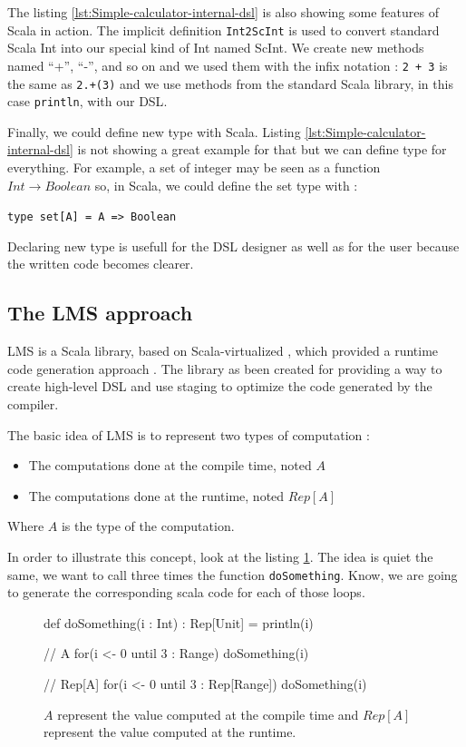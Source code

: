 The listing \ref{lst:Simple-calculator-internal-dsl} is also showing some
features of Scala in action. The implicit definition {\normalsize \verb|Int2ScInt|} is used to
convert standard Scala Int into our special kind of Int named ScInt. We create
new methods named ``+'', ``-'', and so on and we used them with the infix
notation : {\normalsize \verb|2 + 3|} is the same as {\normalsize \verb|2.+(3)|} and we use
methods from the standard Scala library, in this case {\normalsize
\verb|println|}, with our \gls{DSL}.

Finally, we could define new type with Scala. Listing
\ref{lst:Simple-calculator-internal-dsl} is not showing a great example for that
but we can define type for everything. For example, a set of integer may be seen
as a function $Int \rightarrow Boolean$ so, in Scala, we could define the set
type with :

\texttt{type set[A] = A => Boolean}

Declaring new type is usefull for the \gls{DSL} designer as well as for the user
because the written code becomes clearer.

\subsection{The LMS approach}
\label{subsec:lms_approach}

\gls{LMS} is a Scala library, based on Scala-virtualized \cite{Rompf2012}, which
provided a runtime code generation approach
\cite{Rompf:2010:LMS:1942788.1868314}. The library as been created for providing
a way to create high-level \gls{DSL} and use staging to optimize the code
generated by the compiler.

The basic idea of \gls{LMS} is to represent two types of computation :
\begin{itemize}
\item The computations done at the compile time, noted $A$
\item The computations done at the runtime, noted $Rep[A]$
\end{itemize}

Where $A$ is the type of the computation.

In order to illustrate this concept, look at the listing \ref{lst:lms-example}.
The idea is quiet the same, we want to call three times the function
{\normalsize \verb|doSomething|}. Know, we are going to generate the
corresponding scala code for each of those loops.

\begin{figure}[ht]
  \centering
\begin{scalacode}
def doSomething(i : Int) : Rep[Unit] = {
	println(i)
}

// A
for(i <- 0 until 3 : Range) {
	doSomething(i)
}

// Rep[A]
for(i <- 0 until 3 : Rep[Range]) {
	doSomething(i)
}
\end{scalacode}
  \caption[Difference between \(A\) and \(Rep\lbrack A\rbrack\) in a code example]{$A$ represent
    the value computed at the compile time and $Rep[A]$ represent the value
    computed at the runtime.}
  \label{lst:lms-example}
\end{figure}

